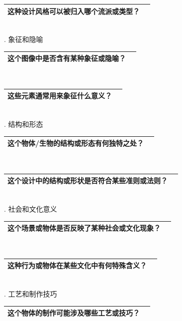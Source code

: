 \documentclass[12pt]{book}
\begin{document}
\begin{tabular}{|p{15cm}|p{3cm}|}
	\hline
这种设计风格可以被归入哪个流派或类型？\\
	\hline
\end{tabular}\\


. 象征和隐喻

\begin{tabular}{|p{15cm}|p{3cm}|}
	\hline
这个图像中是否含有某种象征或隐喻？\\
	\hline
\end{tabular}\\



\begin{tabular}{|p{15cm}|p{3cm}|}
	\hline
这些元素通常用来象征什么意义？\\
	\hline
\end{tabular}\\


. 结构和形态

\begin{tabular}{|p{15cm}|p{3cm}|}
	\hline
这个物体/生物的结构或形态有何独特之处？\\
	\hline
\end{tabular}\\


\begin{tabular}{|p{15cm}|p{3cm}|}
	\hline
这个设计中的结构或形状是否符合某些准则或法则？\\
	\hline
\end{tabular}\\

. 社会和文化意义

\begin{tabular}{|p{15cm}|p{3cm}|}
	\hline
这个场景或物体是否反映了某种社会或文化现象？\\
	\hline
\end{tabular}\\


\begin{tabular}{|p{15cm}|p{3cm}|}
	\hline
这种行为或物体在某些文化中有何特殊含义？\\
	\hline
\end{tabular}\\



. 工艺和制作技巧

\begin{tabular}{|p{15cm}|p{3cm}|}
	\hline
这个物体的制作可能涉及哪些工艺或技巧？\\
	\hline
\end{tabular}\\
\end{document}
